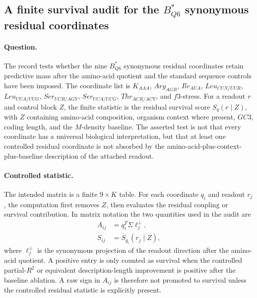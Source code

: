 \subsection{A finite survival audit for the $B^{\ast}_{Q6}$ synonymous residual coordinates}
\label{sec:translation-survival-b-star-q6-survival-matrix-translation-realization}

\paragraph{Question.}
The record tests whether the nine $B^{\ast}_{Q6}$ synonymous residual coordinates retain predictive mass after the amino-acid quotient and the standard sequence controls have been imposed.  The coordinate list is
$K_{AAA}$, $Arg_{AGR}$, $Ile_{AUA}$, $Leu_{CUN/UUR}$, $Leu_{UUA/UUG}$, $Ser_{UCR/AGY}$, $Ser_{UCA/UCG}$, $Thr_{ACR/ACY}$, and $f3$-stress.  For a readout $r$ and control block $Z$, the finite statistic is the residual survival score $S_q(r\mid Z)$, with $Z$ containing amino-acid composition, organism context where present, $GC3$, coding length, and the $M$-density baseline.  The asserted test is not that every coordinate has a universal biological interpretation, but that at least one controlled residual coordinate is not absorbed by the amino-acid-plus-context-plus-baseline description of the attached readout.

\paragraph{Controlled statistic.}
The intended matrix is a finite $9\times K$ table.  For each coordinate $q_i$ and readout $r_j$, the computation first removes $Z$, then evaluates the residual coupling or survival contribution.  In matrix notation the two quantities used in the audit are
$$
\begin{aligned}
A_{ij} &= q_i^{T}\Sigma \ell_j^{\perp},\\
S_{ij} &= S_{q_i}(r_j\mid Z),
\end{aligned}
$$
where $\ell_j^{\perp}$ is the synonymous projection of the readout direction after the amino-acid quotient.  A positive entry is only counted as survival when the controlled partial-$R^2$ or equivalent description-length improvement is positive after the baseline ablation.  A raw sign in $A_{ij}$ is therefore not promoted to survival unless the controlled residual statistic is explicitly present.

